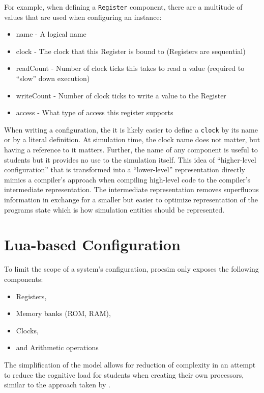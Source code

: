 For example, when defining a \verb|Register| component, there are a multitude of values that are used when configuring an instance: 
\begin{itemize}
\item name - A logical name
\item clock - The clock that this Register is bound to (Registers are sequential)
\item readCount - Number of clock ticks this takes to read a value (required to ``slow'' down execution)
\item writeCount - Number of clock ticks to write a value to the Register
\item access - What type of access this register supports
\end{itemize}
When writing a configuration, the it is likely easier to define a \verb|clock| by its name or by a literal definition. At simulation time, the clock name does not matter, but having a reference to it matters. Further, the name of any component is useful to students but it provides no use to the simulation itself. This idea of ``higher-level configuration'' that is transformed into a ``lower-level'' representation directly mimics a compiler's approach when compiling high-level code to the compiler's intermediate representation. The intermediate representation removes superfluous information in exchange for a smaller but easier to optimize representation of the programs state which is how simulation entities should be represented.



\section{Lua-based Configuration}

To limit the scope of a system's configuration, procsim only exposes the following components: 
\begin{itemize}
    \item Registers,
    \item Memory banks (ROM, RAM),
    \item Clocks,
    \item and Arithmetic operations
\end{itemize}
The simplification of the model allows for reduction of complexity in an attempt to reduce the cognitive load for students when creating their own processors, similar to the approach taken by \cite{Skrien2001,Garcia2009}. 

